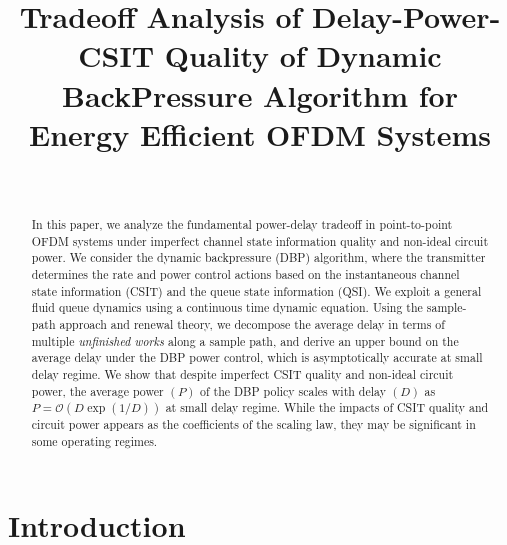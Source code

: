 \documentclass[11pt,journal, onecolumn]{./IEEEtran}
\newcommand{\red}{\color{black}}
\begin{document}
\title{Tradeoff Analysis of Delay-Power-CSIT Quality of Dynamic BackPressure Algorithm for Energy Efficient OFDM Systems}

\author{\\}

\maketitle
\begin{abstract}
In this paper, we analyze the fundamental power-delay tradeoff in point-to-point OFDM systems under imperfect channel state information quality and non-ideal circuit power. We consider the dynamic backpressure (DBP) algorithm, where the transmitter determines the rate and power control actions based on the instantaneous channel state information (CSIT) and the queue state information (QSI). We exploit a general fluid queue dynamics using a continuous time dynamic equation. Using the sample-path approach and renewal theory, we decompose the average delay in terms of multiple {\em unfinished works} along a sample path, and derive an upper bound on the average delay under the DBP power control, which is asymptotically accurate at small delay regime. We show that despite imperfect CSIT quality and non-ideal circuit power, the average power $(P)$ of the DBP policy scales with delay $(D)$ as $P=\mathcal O(D \exp(1/D))$ at small delay regime. {\red While the impacts of CSIT quality and circuit power appears as the coefficients of the scaling law, they may be significant in some operating regimes. }
\end{abstract}

\newtheorem{Result}{Result}
\newtheorem{Problem}{Problem}
\newtheorem{Definition}{Definition}
\newtheorem{Lemma}{Lemma}
\newtheorem{Assumption}{Assumption}
\newtheorem{Remark}{Remark}
\newtheorem{Theorem}{Theorem}
\newtheorem{Corollary}{Corollary}




\section{Introduction}
\end{document}

